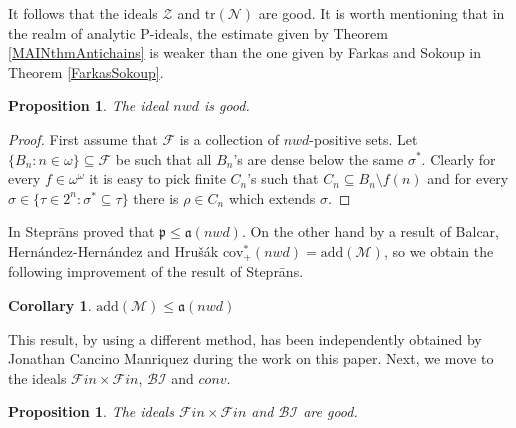 \documentclass[a4paper]{amsart}
\newtheorem{proposition}[theorem]{Proposition}
\newtheorem{corollary}[theorem]{Corollary}
\newcommand{\aaa}{\mathfrak{a}}
\newcommand{\ppp}{\mathfrak{p}}
\newcommand{\Meager}{\mathcal{M}}
\newcommand{\Null}{\mathcal{N}}
\newcommand{\add}{\mathrm{add}}
\newcommand{\cov}{\mathrm{cov}}
\newcommand{\FF}{\mathcal{F}in\times\mathcal{F}in}
\newcommand{\nwd}{nwd}
\newcommand{\Z}{\mathcal{Z}}
\newcommand{\conv}{conv}
\newcommand{\trN}{\mathrm{tr}(\Null)}
\newcommand{\BI}{\mathcal{BI}}
\begin{document}
It follows that the ideals $\Z$ and $\trN$ are good. It is worth mentioning that in the realm of analytic P-ideals, the estimate given by Theorem \ref{MAINthmAntichains} is weaker than the one given by Farkas and Sokoup in Theorem \ref{FarkasSokoup}. 
\begin{proposition}
    The ideal $\nwd$ is good.
\end{proposition}
\begin{proof}
    First assume that $\mathcal{F}$ is a collection of $\nwd$-positive sets. Let $\{B_{n}:n\in\omega\}\subseteq\mathcal{F}$ be such that all $B_{n}$'s are dense below the same $\sigma^{*}$. Clearly for every $f\in\omega^{\omega}$ it is easy to pick finite $C_{n}$'s such that $C_{n}\subseteq B_{n}\setminus f(n)$ and for every $\sigma\in \{\tau\in2^{n}:\sigma^{*}\subseteq\tau\}$ there is $\rho\in C_{n}$ which extends $\sigma$.
\end{proof}
In \cite{Steprans} Steprāns proved that $\ppp\leq \aaa(\nwd)$. On the other hand by a result of Balcar, Hernández-Hernández and Hrušák $\cov^{*}_{+}(\nwd)=\add(\Meager)$, so we obtain the following improvement of the result of Steprāns.
\begin{corollary}
    $\add(\Meager)\leq \aaa(\nwd)$
\end{corollary}
This result, by using a different method, has been independently obtained by Jonathan Cancino Manriquez during the work on this paper. Next, we move to the ideals $\FF$, $\BI$ and $\conv$.
\begin{proposition}
    The ideals $\FF$ and $\BI$ are good.
\end{proposition}
\end{document}
